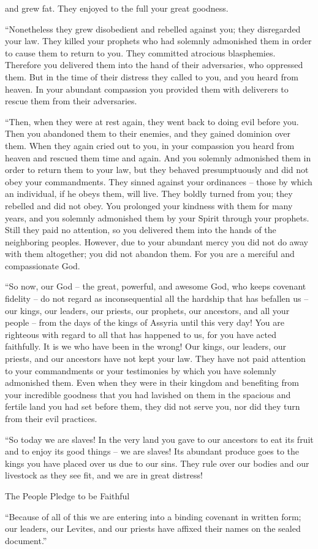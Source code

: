 {and grew fat.
They enjoyed
to the full your great
goodness.
\par }{\PP {}“Nonetheless they grew disobedient
and rebelled against
you; they disregarded
your law.
They killed
your prophets
who had
solemnly admonished
them in order to cause them to return
to
you. They committed
atrocious
blasphemies.
Therefore you delivered
them into the hand
of their adversaries,
who oppressed
them. But in the time
of their distress
they called
to
you, and you
heard
from heaven.
In your abundant
compassion
you provided
them with deliverers
to rescue
them from their adversaries.
\par }{\PP {}“Then, when they were at rest
again, they went back
to doing
evil
before
you. Then you abandoned
them to their enemies,
and they gained
dominion over them. When they again
cried
out to you,
in your compassion
you heard
from heaven
and rescued
them time and again.
And you solemnly admonished
them in order to return
them to
your law,
but they
behaved presumptuously
and did not
obey
your commandments.
They sinned
against your ordinances
– those by which
an individual,
if he obeys
them, will live.
They boldly turned from
you; they rebelled
and did not
obey.
You prolonged
your kindness with them
for many
years,
and you solemnly admonished
them by your Spirit
through
your prophets.
Still they paid no
attention,
so you delivered
them into the hands
of the neighboring
peoples.
However, due to your abundant
mercy
you did not
do
away
with them altogether;
you did not
abandon
them. For
you are
a merciful
and compassionate
God.
\par }{\PP {}“So now,
our God
– the great,
powerful,
and awesome
God,
who keeps
covenant
fidelity –
do not
regard as
inconsequential
all
the hardship
that
has befallen us – our kings, our leaders, our priests, our prophets, our ancestors, and all your people – from the days of the kings of Assyria until this very day!
You
are righteous
with
regard to all
that has happened
to
us, for
you have acted
faithfully.
It is we
who have been in the wrong!
Our kings,
our leaders,
our priests,
and our ancestors
have not
kept
your law.
They have not
paid attention
to
your commandments
or your testimonies
by which
you have solemnly admonished them.
Even when they
were in their kingdom
and benefiting from your incredible
goodness
that you had
lavished
on them
in the spacious
and fertile
land
you had
set
before
them, they did not
serve
you, nor
did they turn
from their evil
practices.
\par }{\PP {}“So today
we
are slaves! In the very land
you gave
to our ancestors
to eat
its fruit
and to enjoy its
good things
– we
are slaves!
Its abundant
produce
goes to the kings
you have
placed over us
due to our sins.
They rule
over our bodies
and our livestock
as they see fit,
and we
are in great
distress!
\par }{\SH The People Pledge to be Faithful
\par }{\PP {} “Because of all
of this
we
are entering into a binding covenant
in written
form; our leaders,
our Levites,
and our priests
have affixed their names on
the sealed document.”

}
